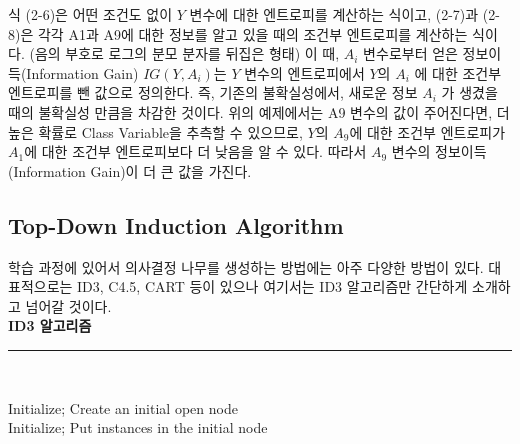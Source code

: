 \documentclass[a4paper]{oblivoir}
\begin{document}
\indent 식 (2-6)은 어떤 조건도 없이 $Y$ 변수에 대한 엔트로피를 계산하는 식이고, (2-7)과 (2-8)은 각각 A1과 A9에 대한 정보를 알고 있을 때의 조건부 엔트로피를 계산하는 식이다. (음의 부호로 로그의 분모 분자를 뒤집은 형태)
\indent 이 때, $A_{i}$ 변수로부터 얻은 정보이득(Information Gain) $IG(Y, A_{i})$는 $Y$ 변수의 엔트로피에서 $Y$의 $A_{i}$ 에 대한 조건부 엔트로피를 뺀 값으로 정의한다. 즉, 기존의 불확실성에서, 새로운 정보 $A_{i}$ 가 생겼을 때의 불확실성 만큼을 차감한 것이다. 위의 예제에서는 A9 변수의 값이 주어진다면, 더 높은 확률로 Class Variable을 추측할 수 있으므로, $Y$의 $A_{9}$에 대한 조건부 엔트로피가 $A_{1}$에 대한 조건부 엔트로피보다 더 낮음을 알 수 있다. 따라서 $A_{9}$ 변수의 정보이득(Information Gain)이 더 큰 값을 가진다.

\subsection{Top-Down Induction Algorithm}
학습 과정에 있어서 의사결정 나무를 생성하는 방법에는 아주 다양한 방법이 있다. 대표적으로는 ID3, C4.5, CART 등이 있으나 여기서는 ID3 알고리즘만 간단하게 소개하고 넘어갈 것이다. \\
\textbf{ID3 알고리즘} \\
\indent\rule{10cm}{0.4pt} \\
\begin{algorithm}[H]
	\SetAlgoLined
	Initialize; Create an initial open node \\
	Initialize; Put instances in the initial node \\
\end{algorithm}
\end{document}
